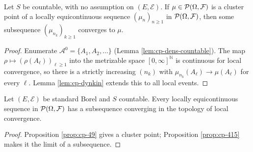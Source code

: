 \begin{proposition}[Georgii (4.15)]
    \label{prop:cp-415}
    \leanok

    Let $S$ be countable, with no assumption on $(E, \mathcal{E})$. If
    $\mu \in \mathcal{P}(\Omega, \mathcal{F})$ is a cluster point of a locally equicontinuous sequence
    $(\mu_n)_{n \geq 1}$ in $\mathcal{P}(\Omega, \mathcal{F})$, then some subsequence
    $(\mu_{n_k})_{k\geq 1}$ converges to $\mu$.
\end{proposition}
\begin{proof}
    \leanok

    Enumerate $\mathcal{A}^0 = \{A_1, A_2, \dots\}$ (Lemma \ref{lem:cp-dens-countable}). The map
    $\rho \mapsto (\rho(A_\ell))_{\ell \geq 1}$ into the metrizable space
    $[0,\infty]^{\mathbb{N}}$ is continuous for local convergence, so there is a strictly
    increasing $(n_k)$ with $\mu_{n_k}(A_\ell) \to \mu(A_\ell)$ for every $\ell$.
    Lemma \ref{lem:cp-dynkin} extends this to all local events.
\end{proof}

\begin{corollary}
    \label{cor:cp-49-415}
    \leanok

    Let $(E, \mathcal{E})$ be standard Borel and $S$ countable. Every locally equicontinuous
    sequence in $\mathcal{P}(\Omega, \mathcal{F})$ has a subsequence converging in the topology of
    local convergence.
\end{corollary}
\begin{proof}
    \leanok

    Proposition \ref{prop:cp-49} gives a cluster point; Proposition \ref{prop:cp-415} makes it
    the limit of a subsequence.
\end{proof}
